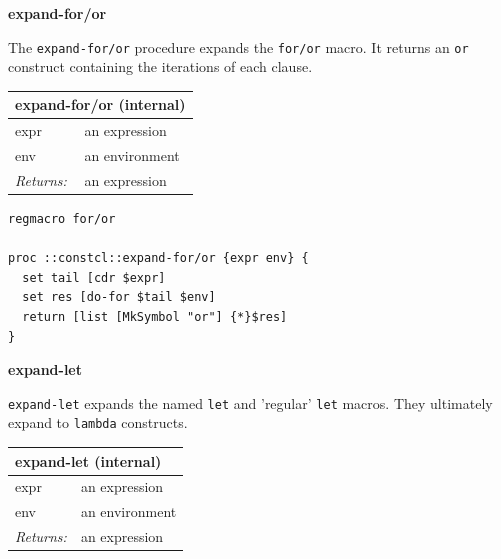 \documentclass[twoside,9pt]{report}
\begin{document}
\textbf{expand-for/or}


The \texttt{expand-for/or} procedure expands the \texttt{for/or} macro. It returns an \texttt{or} construct containing the iterations of each clause.

\begin{tabular}{ |l l| }
\hline
\multicolumn{2}{|l|}{expand-for/or (internal)} \\
\hline
expr & an expression \\
env & an environment \\
\textit{Returns:} & an expression \\
\hline
\end{tabular}

\noindent\makebox[\linewidth]{\rule{\linewidth}{0.4pt}}
\begin{lstlisting}
regmacro for/or
 
proc ::constcl::expand-for/or {expr env} {
  set tail [cdr $expr]
  set res [do-for $tail $env]
  return [list [MkSymbol "or"] {*}$res]
}
\end{lstlisting}
\noindent\makebox[\linewidth]{\rule{\linewidth}{0.4pt}}

\textbf{expand-let}


\texttt{expand-let} expands the named \texttt{let} and 'regular' \texttt{let} macros. They ultimately expand to \texttt{lambda} constructs.

\begin{tabular}{ |l l| }
\hline
\multicolumn{2}{|l|}{expand-let (internal)} \\
\hline
expr & an expression \\
env & an environment \\
\textit{Returns:} & an expression \\
\hline
\end{tabular}
\end{document}
